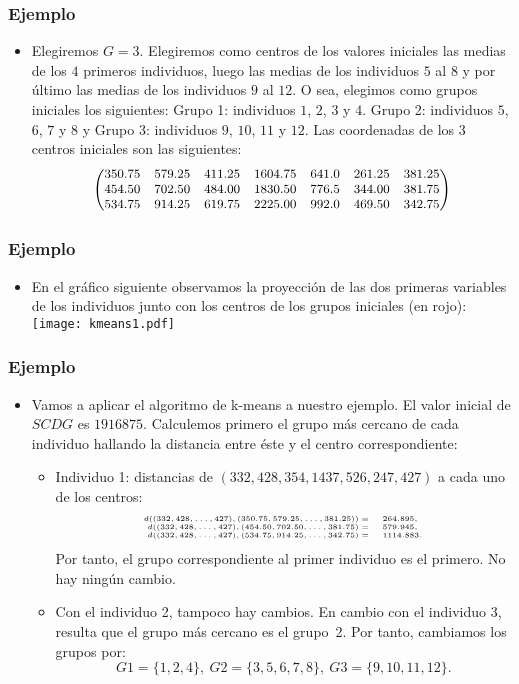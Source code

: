 \begin{frame}
\frametitle{Ejemplo}
\begin{itemize}
\item<2->{Elegiremos $G=3$. Elegiremos como centros de los valores iniciales las medias de los $4$ primeros individuos, luego las medias de los individuos $5$ al $8$ y por último las medias de los individuos $9$ al $12$. O sea, elegimos como grupos iniciales los siguientes:
Grupo 1: individuos $1$, $2$, $3$ y $4$. Grupo 2: individuos $5$, $6$, $7$ y $8$ y Grupo 3: individuos $9$, $10$, $11$ y $12$. Las coordenadas de los $3$ centros iniciales son las siguientes:
$$
{\small \begin{pmatrix}
350.75 & 579.25 & 411.25 & 1604.75 & 641.0 & 261.25 & 381.25 \\
454.50 & 702.50 & 484.00 & 1830.50 & 776.5 & 344.00 & 381.75 \\
534.75 & 914.25 & 619.75 & 2225.00 & 992.0 & 469.50 & 342.75 \\
\end{pmatrix}}
$$}
\end{itemize}
\end{frame}
\begin{frame}
\frametitle{Ejemplo}
\begin{itemize}
\item<2->{En el gráfico siguiente observamos la proyección de las dos primeras variables de los individuos junto con los centros de los grupos iniciales (en rojo):
\vskip0.25cm
\texttt{[image: kmeans1.pdf]}}
\end{itemize}
\end{frame}
\begin{frame}
\frametitle{Ejemplo}
\begin{itemize}
\item<-2>{Vamos a aplicar el algoritmo de k-means a nuestro ejemplo. El valor inicial de $SCDG$ es $1916875$. Calculemos primero el grupo más cercano de cada individuo hallando la distancia entre éste y el centro correspondiente:
\begin{itemize}
\item Individuo 1: distancias de $(332,428,354,1437,526,247,427)$ a cada uno de los centros: 
$$
{\tiny
\begin{array}{rl}
d((332,428,\ldots ,427), (350.75, 579.25 ,\ldots , 381.25)) = & 264.895, \\
d((332,428,\ldots ,427), (454.50, 702.50 , \ldots , 381.75 ) = & 579.945, \\
d((332,428,\ldots ,427), (534.75, 914.25, \ldots , 342.75 ) = & 1114.883.
\end{array}}$$
Por tanto, el grupo correspondiente al primer individuo es el primero. No hay ningún cambio.
\item Con el individuo 2, tampoco hay cambios. En cambio con el individuo 3, resulta que el grupo más cercano es el grupo~2. Por tanto, cambiamos los grupos por: 
$$
G1 = \{ 1,2,4\},\ G2 = \{3,5,6,7,8\},\ G3 = \{ 9,10,11,12\}.
$$
\end{itemize}
}
\end{itemize}
\end{frame}

